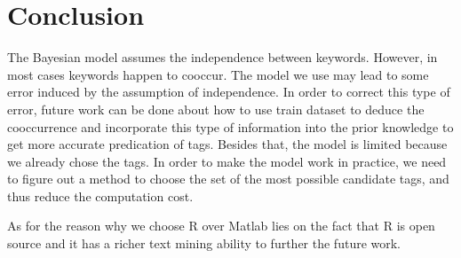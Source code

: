 \section{Conclusion} \label{sec:conclusion}
The Bayesian model assumes the independence between keywords. However, in most cases keywords happen to cooccur. The model we use may lead to some error induced by the assumption of independence. In order to correct this type of error, future work can be done about how to use train dataset to deduce the cooccurrence and incorporate this type of information into the prior knowledge to get more accurate predication of tags. Besides that, the model is limited because we already chose the tags. In order to make the model work in practice, we need to figure out a method to choose the set of the most possible candidate tags, and thus reduce the computation cost.

As for the reason why we choose R over Matlab lies on the fact that R is open source and it has a richer text mining ability to further the future work.
